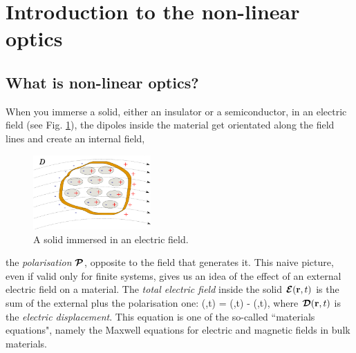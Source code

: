 \section{Introduction to the non-linear optics} 


\subsection{What is non-linear optics?}
When you immerse a solid, either an insulator or a semiconductor, in an electric field (see Fig. \ref{immerse}), the dipoles inside the material get orientated along the field lines and create an internal field, 
\begin{figure}
  \begin{center}
    \includegraphics[width=0.4\textwidth]{Figures/immerse}
  \end{center}
  \caption{A solid immersed in an electric field. \label{immerse}}
\end{figure}
the \emph{polarisation} ${\boldsymbol {\cal P}}$, opposite to the field that generates it. This naive picture, even if valid only for finite systems, gives us an idea of the effect of an external electric field on a material.
The \emph{total electric field} inside the solid ${\boldsymbol {\cal E}}({\bf r},t)$ is the sum of the external plus the polarisation one:
\be
\EEc(\rr,t) = \DDc(\rr,t) - \PPc(\rr,t),
\label{materialeq}
\ee
where ${\boldsymbol {\cal D}}({\bf r},t)$ is the \emph{electric displacement}.
This equation is one of the so-called  ``materials equations", namely the Maxwell equations for electric and magnetic fields in bulk materials. %

